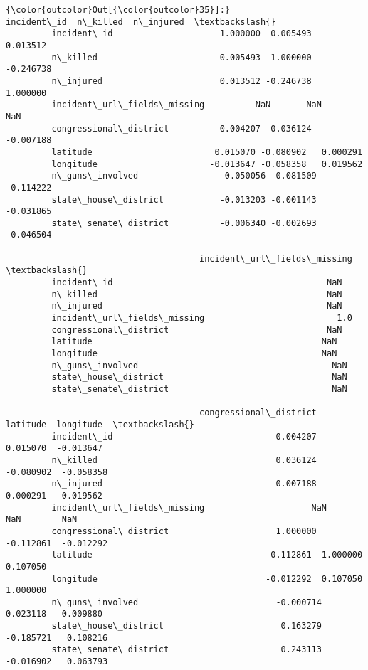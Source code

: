 \documentclass[11pt]{article}
\begin{document}
\begin{Verbatim}[commandchars=\\\{\}]
{\color{outcolor}Out[{\color{outcolor}35}]:}                              incident\_id  n\_killed  n\_injured  \textbackslash{}
         incident\_id                     1.000000  0.005493   0.013512   
         n\_killed                        0.005493  1.000000  -0.246738   
         n\_injured                       0.013512 -0.246738   1.000000   
         incident\_url\_fields\_missing          NaN       NaN        NaN   
         congressional\_district          0.004207  0.036124  -0.007188   
         latitude                        0.015070 -0.080902   0.000291   
         longitude                      -0.013647 -0.058358   0.019562   
         n\_guns\_involved                -0.050056 -0.081509  -0.114222   
         state\_house\_district           -0.013203 -0.001143  -0.031865   
         state\_senate\_district          -0.006340 -0.002693  -0.046504   
         
                                      incident\_url\_fields\_missing  \textbackslash{}
         incident\_id                                          NaN   
         n\_killed                                             NaN   
         n\_injured                                            NaN   
         incident\_url\_fields\_missing                          1.0   
         congressional\_district                               NaN   
         latitude                                             NaN   
         longitude                                            NaN   
         n\_guns\_involved                                      NaN   
         state\_house\_district                                 NaN   
         state\_senate\_district                                NaN   
         
                                      congressional\_district  latitude  longitude  \textbackslash{}
         incident\_id                                0.004207  0.015070  -0.013647   
         n\_killed                                   0.036124 -0.080902  -0.058358   
         n\_injured                                 -0.007188  0.000291   0.019562   
         incident\_url\_fields\_missing                     NaN       NaN        NaN   
         congressional\_district                     1.000000 -0.112861  -0.012292   
         latitude                                  -0.112861  1.000000   0.107050   
         longitude                                 -0.012292  0.107050   1.000000   
         n\_guns\_involved                           -0.000714  0.023118   0.009880   
         state\_house\_district                       0.163279 -0.185721   0.108216   
         state\_senate\_district                      0.243113 -0.016902   0.063793   
         

\end{Verbatim}
\end{document}
